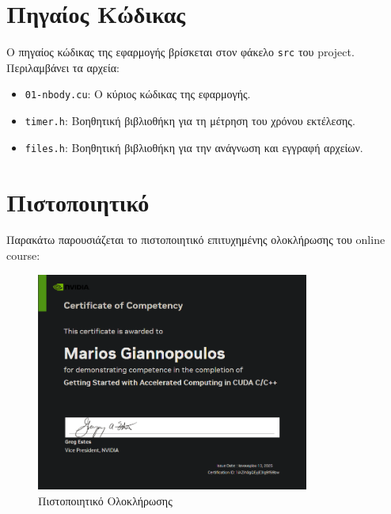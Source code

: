 \documentclass{article}
\begin{document}
\section{Πηγαίος Κώδικας}
Ο πηγαίος κώδικας της εφαρμογής βρίσκεται στον φάκελο \texttt{src} του project. Περιλαμβάνει τα αρχεία:
\begin{itemize}
    \item \texttt{01-nbody.cu}: Ο κύριος κώδικας της εφαρμογής.
    \item \texttt{timer.h}: Βοηθητική βιβλιοθήκη για τη μέτρηση του χρόνου εκτέλεσης.
    \item \texttt{files.h}: Βοηθητική βιβλιοθήκη για την ανάγνωση και εγγραφή αρχείων.
\end{itemize}
\section{Πιστοποιητικό}
Παρακάτω παρουσιάζεται το πιστοποιητικό επιτυχημένης ολοκλήρωσης του online course:
\begin{figure}[h]
\centering
\includegraphics[width=0.8\textwidth]{certificate.png}
\caption{Πιστοποιητικό Ολοκλήρωσης}
\end{figure}
\end{document}
